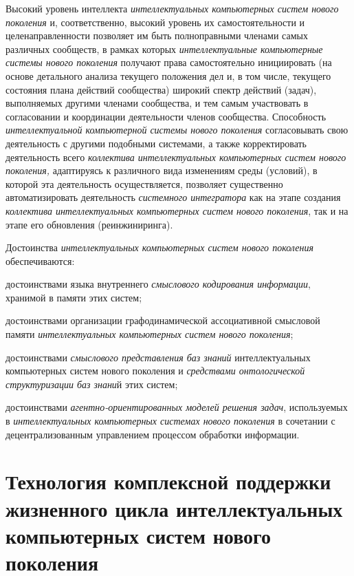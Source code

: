 Высокий уровень интеллекта \textit{интеллектуальных компьютерных систем нового поколения} и, соответственно, высокий уровень их самостоятельности и целенаправленности позволяет им быть полноправными членами самых различных сообществ, в рамках которых \textit{интеллектуальные компьютерные системы нового поколения} получают права самостоятельно инициировать (на основе детального анализа текущего положения дел и, в том числе, текущего состояния плана действий сообщества) широкий спектр действий (задач), выполняемых другими членами сообщества, и тем самым участвовать в согласовании и координации деятельности членов сообщества. Способность \textit{интеллектуальной компьютерной системы нового поколения} согласовывать свою деятельность с другими подобными системами, а также корректировать деятельность всего \textit{коллектива интеллектуальных компьютерных систем нового поколения,} адаптируясь к различного вида изменениям среды (условий), в которой эта деятельность осуществляется, позволяет существенно автоматизировать деятельность \textit{системного интегратора} как на этапе создания \textit{коллектива интеллектуальных компьютерных систем нового поколения}, так и на этапе его обновления (реинжиниринга).

Достоинства \textit{интеллектуальных компьютерных систем нового поколения} обеспечиваются:

\begin{textitemize}
	\item
	достоинствами языка внутреннего \textit{смыслового кодирования информации}, хранимой в памяти этих систем;
	\item
	достоинствами организации графодинамической ассоциативной смысловой памяти \textit{интеллектуальных компьютерных систем нового поколения};
	\item
	достоинствами \textit{смыслового представления баз знаний} интеллектуальных компьютерных систем нового поколения и \textit{средствами онтологической структуризации баз знани}й этих систем;
	\item
	достоинствами \textit{агентно-ориентированных моделей решения задач}, используемых в \textit{интеллектуальных компьютерных системах нового поколения} в сочетании с децентрализованным управлением процессом обработки информации.
\end{textitemize}

\section{Технология комплексной поддержки жизненного цикла интеллектуальных компьютерных систем нового поколения}

